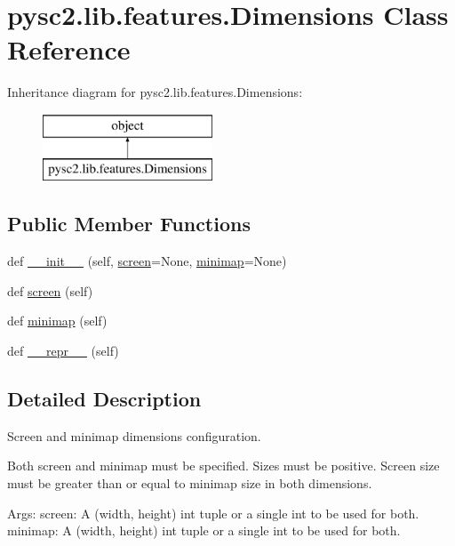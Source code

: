 \hypertarget{classpysc2_1_1lib_1_1features_1_1_dimensions}{}\section{pysc2.\+lib.\+features.\+Dimensions Class Reference}
\label{classpysc2_1_1lib_1_1features_1_1_dimensions}
Inheritance diagram for pysc2.\+lib.\+features.\+Dimensions\+:\begin{figure}[H]
\begin{center}
\leavevmode
\includegraphics[height=2.000000cm]{classpysc2_1_1lib_1_1features_1_1_dimensions}
\end{center}
\end{figure}
\subsection*{Public Member Functions}
\begin{DoxyCompactItemize}
\item 
def \mbox{\hyperlink{classpysc2_1_1lib_1_1features_1_1_dimensions_a1baec57f9a7f019d9c9147e10473a15e}{\+\_\+\+\_\+init\+\_\+\+\_\+}} (self, \mbox{\hyperlink{classpysc2_1_1lib_1_1features_1_1_dimensions_a8f2a12331c6acb2070a3cd77ce4019f0}{screen}}=None, \mbox{\hyperlink{classpysc2_1_1lib_1_1features_1_1_dimensions_ac3367e0b221b72b66beb5f5b1d5a1169}{minimap}}=None)
\item 
def \mbox{\hyperlink{classpysc2_1_1lib_1_1features_1_1_dimensions_a8f2a12331c6acb2070a3cd77ce4019f0}{screen}} (self)
\item 
def \mbox{\hyperlink{classpysc2_1_1lib_1_1features_1_1_dimensions_ac3367e0b221b72b66beb5f5b1d5a1169}{minimap}} (self)
\item 
def \mbox{\hyperlink{classpysc2_1_1lib_1_1features_1_1_dimensions_a8e72e9bec4a76d1f91ecdf0523991cae}{\+\_\+\+\_\+repr\+\_\+\+\_\+}} (self)
\end{DoxyCompactItemize}


\subsection{Detailed Description}
\begin{DoxyVerb}Screen and minimap dimensions configuration.

Both screen and minimap must be specified. Sizes must be positive.
Screen size must be greater than or equal to minimap size in both dimensions.

Args:
  screen: A (width, height) int tuple or a single int to be used for both.
  minimap: A (width, height) int tuple or a single int to be used for both.
\end{DoxyVerb}
 

